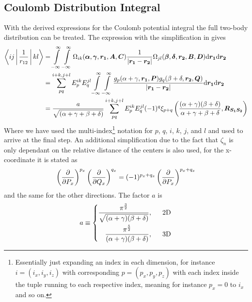 \subsection{Coulomb Distribution Integral}
    With the derived expressions for the Coulomb potential integral the full
    two-body distribution can be treated. The expression with the
    simplification in  gives
        \begin{align}
            \Braket{ij|\frac{1}{r_{12}}|kl} &= \infint\infint
            \Omega_{ik}(\blds{\alpha},\blds{\gamma},\blds{r_1},
            \blds{A},\blds{C}) \frac{1}{\abs{\blds{r_1} - \blds{r_2}}}
            \Omega_{jl}(\blds{\beta},\blds{\delta},\blds{r_2},
            \blds{B},\blds{D}) \md\blds{r_1} \md\blds{r_2} \nonumber \\
            &= \suml{pq}{i+k,j+l} E^{ik}_pE^{jl}_q \infint\infint
            \frac{g_{p}(\alpha+\gamma,\blds{r_1},\blds{P})
            g_{q}(\beta+\delta,\blds{r_2},\blds{Q})}{\abs{\blds{r_1} -
            \blds{r_2}}} \md\blds{r_1} \md\blds{r_2}\nonumber \\
            &= \frac{a}{\sqrt{(\alpha+\gamma+\beta+\delta)}} \suml{pq}{i+k,j+l}
            E^{ik}_pE^{jl}_q (-1)^{q} \xi_{p+q}\left(\frac{(\alpha +
            \gamma)(\beta + \delta)}{\alpha + \gamma + \beta +
            \delta},\blds{R_{S_1S_2}}\right)
            \label{eq:coulomb_dist_integral_stype}
        \end{align}
    Where we have used the multi-index\footnote{Essentially just expanding an
    index in each dimension, for instance $i=(i_x,i_y,i_z)$ with corresponding
    $p=(p_x, p_y, p_z)$ with each index inside the tuple running to each
    respective index, meaning for instance $p_x=0$ to $i_x$ and so on.}
    notation for $p$, $q$, $i$, $k$, $j$, and $l$ 
    and used  to arrive at the final
    step. An additional simplification due to the fact that $\zeta_n$ is only
    dependant on the relative distance of the centers is also used, for the
    x-coordinate it is stated as
        \begin{equation}
            \left(\frac{\mathrm{\partial}}{\mathrm{\partial} P_x}\right)^{p_x}\left(\frac{\mathrm{\partial}}{\mathrm{\partial} Q_x}\right)^{q_x} = (-1)^{p_x+q_x} \left(\frac{\mathrm{\partial}}{\mathrm{\partial} P_x}\right)^{p_x+q_x}
        \end{equation}
    and the same for the other directions. The factor $a$ is
        \begin{equation}
            a \equiv \left\{\begin{aligned}
                \frac{\pi^{\frac{3}{2}}}
                {\sqrt{(\alpha+\gamma)(\beta+\delta)}},\indent \text{2D} \\
                \frac{\pi^{\frac{5}{2}}}
                {(\alpha+\gamma)(\beta+\delta)},\indent \text{3D} \\
            \end{aligned}\right.
        \end{equation}

